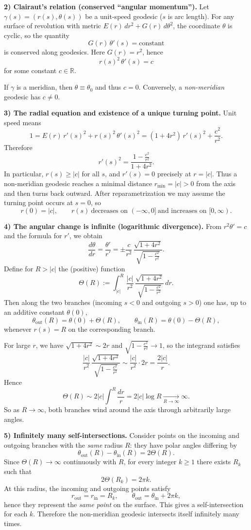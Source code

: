 \documentclass[12pt,a4paper]{article}
\theoremstyle{plain}
\theoremstyle{definition}      %
\begin{document}
	\smallskip
	\textbf{2) Clairaut's relation (conserved ``angular momentum'').}
	Let $\gamma(s)=(r(s),\theta(s))$ be a unit-speed geodesic ($s$ is arc length). For any surface of revolution with metric
	$E(r)\,dr^2+G(r)\,d\theta^2$, the coordinate $\theta$ is cyclic, so the quantity
	\[
	G(r)\,\theta'(s)=\text{constant}
	\]
	is conserved along geodesics. Here $G(r)=r^2$, hence
	\[
	r(s)^2\,\theta'(s)=c
	\]
	for some constant $c\in\mathbb R$.
	
	If $\gamma$ is a meridian, then $\theta\equiv\theta_0$ and thus $c=0$.
	Conversely, a \emph{non-meridian} geodesic has $c\neq 0$.
	
	\smallskip
	\textbf{3) The radial equation and existence of a unique turning point.}
	Unit speed means
	\[
	1 = E(r)\,r'(s)^2 + r(s)^2\,\theta'(s)^2
	= (1+4r^2)\,r'(s)^2 + \frac{c^2}{r^2}.
	\]
	Therefore
	\[
	r'(s)^2
	=
	\frac{1-\frac{c^2}{r^2}}{1+4r^2}.
	\]
	In particular, $r(s)\ge |c|$ for all $s$, and $r'(s)=0$ precisely at $r=|c|$.
	Thus a non-meridian geodesic reaches a minimal distance $r_{\min}=|c|>0$ from the axis and then turns back outward.
	After reparametrization we may assume the turning point occurs at $s=0$, so
	\[
	r(0)=|c|,\qquad r(s)\ \text{decreases on }(-\infty,0]\ \text{and increases on }[0,\infty).
	\]
	
	\smallskip
	\textbf{4) The angular change is infinite (logarithmic divergence).}
	From $r^2\theta'=c$ and the formula for $r'$, we obtain
	\[
	\frac{d\theta}{dr}
	=
	\frac{\theta'}{r'}
	=
	\pm\frac{c}{r^2}\,\frac{\sqrt{1+4r^2}}{\sqrt{1-\frac{c^2}{r^2}}}.
	\]
	Define for $R>|c|$ the (positive) function
	\[
	\Theta(R)
	:=
	\int_{|c|}^{R}
	\frac{|c|}{r^2}\,\frac{\sqrt{1+4r^2}}{\sqrt{1-\frac{c^2}{r^2}}}\,dr.
	\]
	Then along the two branches (incoming $s<0$ and outgoing $s>0$) one has, up to an additive constant $\theta(0)$,
	\[
	\theta_{\text{out}}(R)=\theta(0)+\Theta(R),\qquad
	\theta_{\text{in}}(R)=\theta(0)-\Theta(R),
	\]
	whenever $r(s)=R$ on the corresponding branch.
	
	For large $r$, we have $\sqrt{1+4r^2}\sim 2r$ and $\sqrt{1-\frac{c^2}{r^2}}\to 1$, so the integrand satisfies
	\[
	\frac{|c|}{r^2}\,\frac{\sqrt{1+4r^2}}{\sqrt{1-\frac{c^2}{r^2}}}
	\sim
	\frac{|c|}{r^2}\cdot 2r
	=
	\frac{2|c|}{r}.
	\]
	Hence
	\[
	\Theta(R)\sim 2|c|\int^{R}\frac{dr}{r}=2|c|\log R \xrightarrow[R\to\infty]{}\infty.
	\]
	So as $R\to\infty$, both branches wind around the axis through arbitrarily large angles.
	
	\smallskip
	\textbf{5) Infinitely many self-intersections.}
	Consider points on the incoming and outgoing branches with the \emph{same} radius $R$:
	they have polar angles differing by
	\[
	\theta_{\text{out}}(R)-\theta_{\text{in}}(R)=2\Theta(R).
	\]
	Since $\Theta(R)\to\infty$ continuously with $R$, for every integer $k\ge 1$ there exists $R_k$ such that
	\[
	2\Theta(R_k)=2\pi k.
	\]
	At this radius, the incoming and outgoing points satisfy
	\[
	r_{\text{out}}=r_{\text{in}}=R_k,
	\qquad
	\theta_{\text{out}}=\theta_{\text{in}}+2\pi k,
	\]
	hence they represent the \emph{same point} on the surface. This gives a self-intersection for each $k$.
	Therefore the non-meridian geodesic intersects itself infinitely many times.
	
\end{document}
